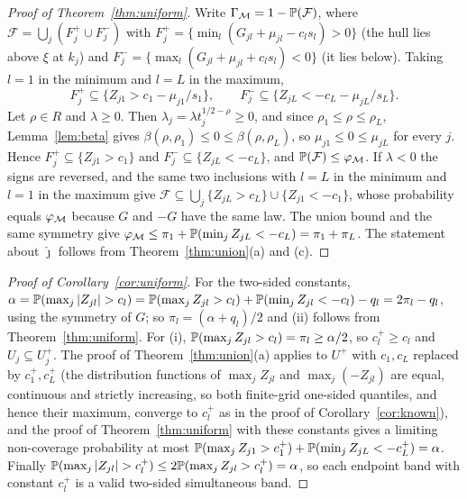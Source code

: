 \begin{proof}[Proof of Theorem~\ref{thm:uniform}]
Write $\Gamma_{\mathcal{M}}=1-\mathbb{P}(\mathcal{F})$, where $\mathcal{F}=\bigcup_j(F^+_j\cup F^-_j)$ with
$F^+_j=\{\min_l(G_{jl}+\mu_{jl}-c_ls_l)>0\}$ (the hull lies above $\xi$ at $k_j$) and
$F^-_j=\{\max_l(G_{jl}+\mu_{jl}+c_ls_l)<0\}$ (it lies below). Taking $l=1$ in the minimum and
$l=L$ in the maximum,
\[
F^+_j\subseteq\{Z_{j1}>c_1-\mu_{j1}/s_1\},\qquad F^-_j\subseteq\{Z_{jL}<-c_L-\mu_{jL}/s_L\}.
\]
Let $\rho\in R$ and $\lambda\ge0$. Then $\lambda_j=\lambda t_j^{1/2-\rho}\ge0$, and since
$\rho_1\le\rho\le\rho_L$, Lemma~\ref{lem:beta} gives $\beta(\rho,\rho_1)\le0\le\beta(\rho,\rho_L)$,
so $\mu_{j1}\le0\le\mu_{jL}$ for every $j$. Hence $F^+_j\subseteq\{Z_{j1}>c_1\}$ and
$F^-_j\subseteq\{Z_{jL}<-c_L\}$, and $\mathbb{P}(\mathcal{F})\le\varphi_{\mathcal{M}}$. If $\lambda<0$ the signs are
reversed, and the same two inclusions with $l=L$ in the minimum and $l=1$ in the maximum give
$\mathcal{F}\subseteq\bigcup_j\{Z_{jL}>c_L\}\cup\{Z_{j1}<-c_1\}$, whose probability equals $\varphi_{\mathcal{M}}$
because $G$ and $-G$ have the same law. The union bound and the same symmetry give
$\varphi_{\mathcal{M}}\le\pi_1+\mathbb{P}(\min_jZ_{jL}<-c_L)=\pi_1+\pi_L$. The statement about $\hat\jmath$
follows from Theorem~\ref{thm:union}(a) and (c). \qedhere
\end{proof}

\begin{proof}[Proof of Corollary~\ref{cor:uniform}]
For the two-sided constants, $\alpha=\Prob(\max_j|Z_{jl}|>c_l)=\Prob(\max_jZ_{jl}>c_l)+
\Prob(\min_jZ_{jl}<-c_l)-q_l=2\pi_l-q_l$, using the symmetry of $G$; so $\pi_l=(\alpha+q_l)/2$ and
(ii) follows from Theorem~\ref{thm:uniform}. For (i), $\mathbb{P}(\max_jZ_{jl}>c_l)=\pi_l\ge\alpha/2$, so
$c_l^+\ge c_l$ and $U_j\subseteq U_j^+$. The proof of Theorem~\ref{thm:union}(a) applies to $U^+$
with $c_1,c_L$ replaced by $c_1^+,c_L^+$ (the distribution functions of $\max_jZ_{jl}$ and $\max_j(-Z_{jl})$ are equal, continuous
and strictly increasing, so both finite-grid one-sided quantiles, and hence their maximum, converge
to $c_l^+$ as in the proof of Corollary~\ref{cor:known}), and the proof of Theorem~\ref{thm:uniform} with these constants gives
a limiting non-coverage probability at most $\mathbb{P}(\max_jZ_{j1}>c_1^+)+\mathbb{P}(\min_jZ_{jL}<-c_L^+)=\alpha$.
Finally $\Prob(\max_j|Z_{jl}|>c_l^+)\le2\Prob(\max_jZ_{jl}>c^+_l)=\alpha$, so each endpoint band with
constant $c_l^+$ is a valid two-sided simultaneous band. \qedhere
\end{proof}

